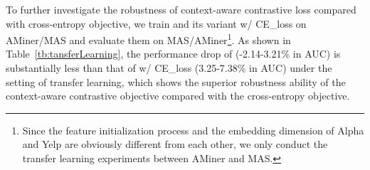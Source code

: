 
 To further investigate the robustness of context-aware contrastive loss compared with cross-entropy objective, we train \smodel and its variant w/ CE\_loss on AMiner/MAS and evaluate them on MAS/AMiner\footnote{Since the feature initialization process and the embedding dimension of Alpha and Yelp are obviously different from each other, we only conduct the transfer learning experiments between AMiner and MAS.}. As shown in Table~\ref{tb:tansferLearning}, the performance drop of \smodel (-2.14-3.21\% in AUC) is substantially less than that of  w/ CE\_loss (3.25-7.38\% in AUC) under the setting of transfer learning, which shows the superior robustness ability of the context-aware contrastive objective compared with the cross-entropy objective. 









